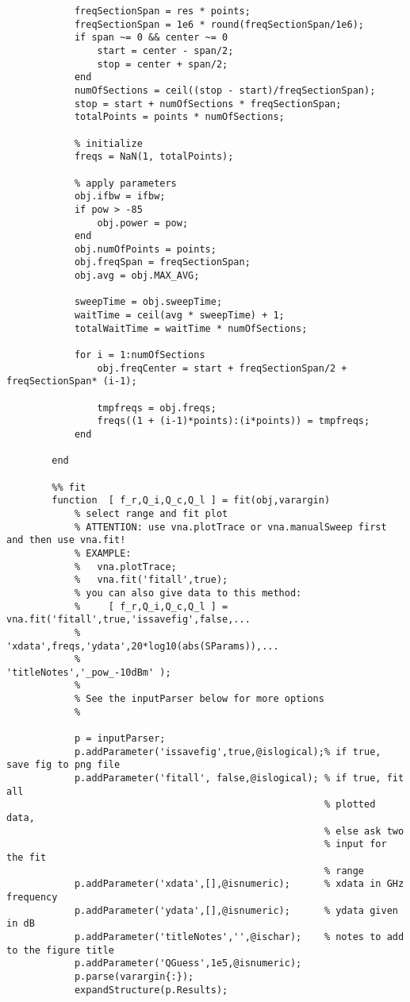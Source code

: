 \begin{lstlisting}
            freqSectionSpan = res * points;
            freqSectionSpan = 1e6 * round(freqSectionSpan/1e6);
            if span ~= 0 && center ~= 0
                start = center - span/2;
                stop = center + span/2;
            end
            numOfSections = ceil((stop - start)/freqSectionSpan);
            stop = start + numOfSections * freqSectionSpan;
            totalPoints = points * numOfSections;
            
            % initialize
            freqs = NaN(1, totalPoints);
            
            % apply parameters
            obj.ifbw = ifbw;
            if pow > -85
                obj.power = pow;
            end
            obj.numOfPoints = points;
            obj.freqSpan = freqSectionSpan;
            obj.avg = obj.MAX_AVG;
            
            sweepTime = obj.sweepTime;
            waitTime = ceil(avg * sweepTime) + 1;
            totalWaitTime = waitTime * numOfSections;
            
            for i = 1:numOfSections
                obj.freqCenter = start + freqSectionSpan/2 +  freqSectionSpan* (i-1);

                tmpfreqs = obj.freqs;
                freqs((1 + (i-1)*points):(i*points)) = tmpfreqs;
            end
            
        end
      
        %% fit
        function  [ f_r,Q_i,Q_c,Q_l ] = fit(obj,varargin)
            % select range and fit plot
            % ATTENTION: use vna.plotTrace or vna.manualSweep first and then use vna.fit!
            % EXAMPLE:
            %   vna.plotTrace;
            %   vna.fit('fitall',true);
            % you can also give data to this method:            
            %     [ f_r,Q_i,Q_c,Q_l ] = vna.fit('fitall',true,'issavefig',false,...
            %                                   'xdata',freqs,'ydata',20*log10(abs(SParams)),...
            %                                   'titleNotes','_pow_-10dBm' );
            %
            % See the inputParser below for more options
            %
            
            p = inputParser;
            p.addParameter('issavefig',true,@islogical);% if true, save fig to png file
            p.addParameter('fitall', false,@islogical); % if true, fit all
                                                        % plotted data,
                                                        % else ask two
                                                        % input for the fit
                                                        % range
            p.addParameter('xdata',[],@isnumeric);      % xdata in GHz frequency
            p.addParameter('ydata',[],@isnumeric);      % ydata given in dB
            p.addParameter('titleNotes','',@ischar);    % notes to add to the figure title
            p.addParameter('QGuess',1e5,@isnumeric);
            p.parse(varargin{:});
            expandStructure(p.Results);
            

\end{lstlisting}
